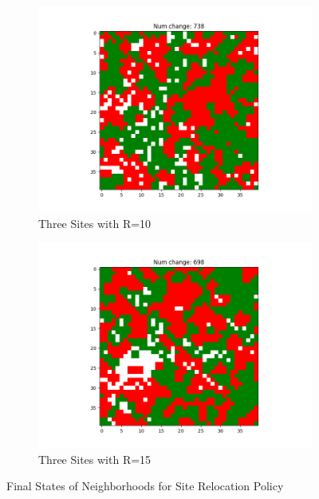 \documentclass[11pt]{article}
\begin{document}
\begin{figure}[h]
\begin{subfigure}{0.14\textwidth}
			\includegraphics[width=\linewidth]{policy3_final_h3r10.png}
			\caption{\centering Three Sites with R=10}
		\end{subfigure}\hfill
		\begin{subfigure}{0.14\textwidth}
			\includegraphics[width=\linewidth]{policy3_final_h3r15.png}
			\caption{\centering Three Sites with R=15}
			\label{p3_h3r15}
		\end{subfigure}
		\caption{Final States of Neighborhoods for Site Relocation Policy}
	\end{figure}
	\FloatBarrier
	
\end{document}
